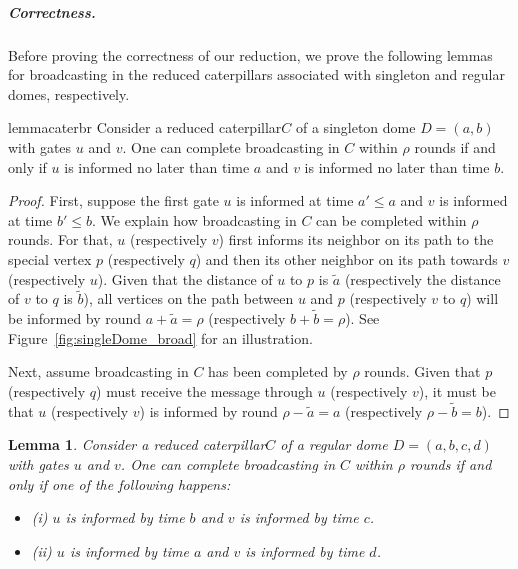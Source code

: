 \documentclass[letterpaper,11pt]{article}
\newtheorem{lemma}[theorem]{Lemma}
\newcommand{\cater}{reduced caterpillar\xspace}
\begin{document}
\subparagraph*{Correctness.}
Before proving the correctness of our reduction, we prove the following lemmas for broadcasting in the reduced caterpillars associated with singleton and regular domes, respectively. 

\begin{restatable}{lemma}{caterbr}\label{lemma:broudguess:singletondomeiff}
Consider a \cater $C$ of a singleton dome $D=(a,b)$ with gates $u$ and $v$. One can complete broadcasting in $C$ within $\rho$ rounds if and only if $u$ is informed no later than time $a$ and $v$ is informed no later than time $b$.
\end{restatable}
\begin{proof}
    First, suppose the first gate $u$ is informed at time $a'\leq a$ and $v$ is informed at time $b'\leq b$. We explain how broadcasting in $C$ can be completed within $\rho$ rounds. For that,  $u$ (respectively $v$) first informs its neighbor on its path to the special vertex $p$ (respectively $q$) and then its other neighbor on its path towards $v$ (respectively $u$). Given that the distance of $u$ to $p$ is $\tilde{a}$ (respectively the distance of $v$ to $q$ is $\tilde{b}$), all vertices on the path between $u$ and $p$ (respectively $v$ to $q$) will be informed by round $a+\tilde{a} = \rho$ (respectively $b + \tilde{b} = \rho$). See Figure~\ref{fig:singleDome_broad} for an illustration.

    Next, assume broadcasting in $C$ has been completed by $\rho$ rounds. Given that $p$ (respectively $q$) must receive the message through $u$ (respectively $v$), it must be that $u$ (respectively $v$) is informed by round $\rho - \tilde{a} = a$ (respectively $\rho - \tilde{b} = b$).
\end{proof}



\begin{lemma}\label{lemma:broudguess:regulardomeiff}
    Consider a \cater $C$ of a regular dome $D=(a,b,c,d)$ with gates $u$ and $v$. One can complete broadcasting in $C$ within $\rho$ rounds if and only if one of the following happens: 
    \begin{itemize}
        \item  (i) $u$ is informed by time $b$ and $v$ is informed by time $c$. 
        \item (ii) $u$ is informed by time $a$ and $v$ is informed by time $d$.
    \end{itemize}
   
\end{lemma}
\end{document}
